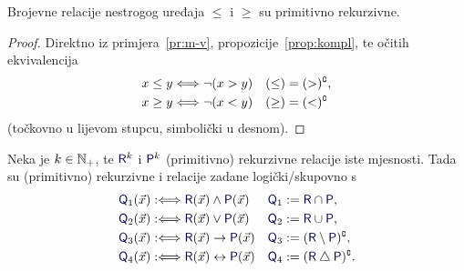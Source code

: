 \begin{korolar}[{name=[primitivna rekurzivnost relacija nestrogog uređaja]}]\label{kor:mj-vj}
Brojevne relacije nestrogog uređaja $\le$ i $\ge$ su primitivno rekurzivne.
\end{korolar}
\begin{proof}
Direktno iz primjera~\ref{pr:m-v}, propozicije~\ref{prop:kompl}, te očitih ekvivalencija
\begin{align}
    x\le y&\Longleftrightarrow\lnot(x>y) & (\le) &= (>)\sp{{\scriptscriptstyle\complement}}\text,\\
    x\ge y&\Longleftrightarrow\lnot(x<y) & (\ge) &= (<)\sp{{\scriptscriptstyle\complement}}
\end{align}
(točkovno u lijevom stupcu, simbolički u desnom).
\end{proof}

\begin{propozicija}[{name=[logički veznici čuvaju (primitivnu) rekurzivnost]}]\label{prop:vezn}
Neka je $k\in{\mathbb N}_+$, te $\f R^k$ i $\f P^k$ (primitivno) rekurzivne relacije iste mjesnosti. Tada su (primitivno) rekurzivne i relacije zadane logički\slash skupovno s
\begin{align}
    \f Q_1(\vec x)&:\Longleftrightarrow\f R(\vec x)\land\f P(\vec x)
    &
    \f Q_1 &:=\f R \cap\f P\text,
    \\
    \f Q_2(\vec x)&:\Longleftrightarrow\f R(\vec x)\lor\f P(\vec x)
    &
    \f Q_2 &:=\f R \cup\f P\text,
    \\
    \f Q_3(\vec x)&:\Longleftrightarrow\f R(\vec x)\to\f P(\vec x)
    &
    \f Q_3 &:=(\f R\setminus\f P)\kompl\text,
    \\
    \f Q_4(\vec x)&:\Longleftrightarrow\f R(\vec x)\leftrightarrow\f P(\vec x)
    &
    \f Q_4 &:=(\f R\mathbin\triangle\f P)\kompl\text.
\end{align}
\end{propozicija}
